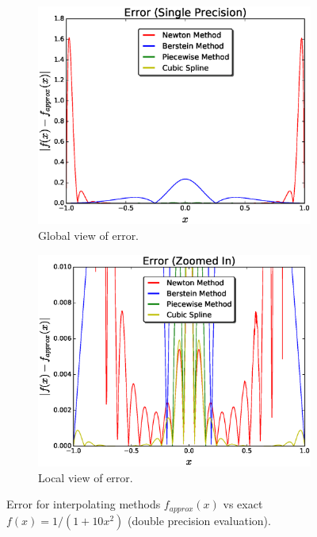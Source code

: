 \documentclass[12pt]{article}
\theoremstyle{remark}
\begin{document}
\begin{figure}[H]
	\centering
	\begin{subfigure}{.5\textwidth}
		\centering
		\includegraphics[width=1.1\linewidth]{NerrorFig1.eps}
		\caption{Global view of error.}
		\label{fig:sub1}
	\end{subfigure}%
	\begin{subfigure}{.5\textwidth}
		\centering
		\includegraphics[width=1.1\linewidth]{NerrorFigg1.eps}
		\caption{Local view of error.}
		\label{fig:sub2}
	\end{subfigure}
	\caption{Error for interpolating methods $f_{approx}(x)$ vs exact $f(x) = 1/(1 + 10x^2)$ (double precision evaluation). }
	\label{fig:test}
\end{figure}
\end{document}
